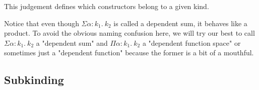 \documentclass{article}
\newcommand{\type}{\ensuremath{\mathtt{type}}}
\newcommand{\kind}{\ensuremath{\mathtt{kind}}}
\begin{document}
This judgement defines which constructors belong to a given kind.


Notice that even though $\Sigma \alpha : k_1. \ k_2$ is called a dependent sum,
it behaves like a product. To avoid the obvious naming confusion here, we will
try our best to call $\Sigma \alpha : k_1. \ k_2$ a "dependent sum" and $\Pi
\alpha : k_1. \ k_2$ a "dependent function space" or sometimes just a "dependent
function" because the former is a bit of a mouthful.

\subsection{Subkinding}
\end{document}
